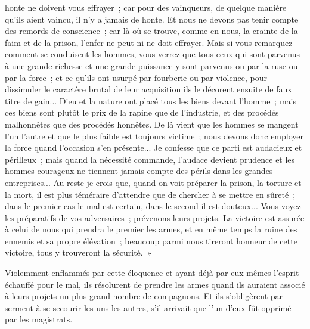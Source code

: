\documentclass[french,twoside]{book} %
\newenvironment{quoteblock}%
  {\begin{quoting}}
  {\end{quoting}}
\newenvironment{quotebar}{%
    \def\FrameCommand{{\color{rubric!10!}\vrule width 0.5em} \hspace{0.9em}}%
    \def\OuterFrameSep{\itemsep} %
    \MakeFramed {\advance\hsize-\width \FrameRestore}
  }%
  {%
    \endMakeFramed
  }
\renewenvironment{quoteblock}%
  {%
    \savenotes
    \setstretch{0.9}
    \normalfont
    \begin{quotebar}
  }
  {%
    \end{quotebar}
    \spewnotes
  }
\begin{document}
\begin{quoteblock}
honte ne doivent vous effrayer ; car pour des vain­queurs, de quelque manière qu'ils aient vaincu, il n'y a jamais de honte. Et nous ne devons pas tenir compte des remords de conscience ; car là où se trouve, comme en nous, la crainte de la faim et de la prison, l'enfer ne peut ni ne doit effrayer. Mais si vous remarquez comment se conduisent les hommes, vous verrez que tous ceux qui sont parvenus à une grande richesse et une grande puissance y sont parvenus ou par la ruse ou par la force ; et ce qu'ils ont usurpé par fourberie ou par violence, pour dissimuler le caractère brutal de leur acquisition ils le décorent ensuite de faux titre de gain... Dieu et la nature ont placé tous les biens devant l'homme ; mais ces biens sont plutôt le prix de la rapine que de l'industrie, et des procédés malhonnêtes que des procédés honnêtes. De là vient que les hommes se mangent l'un l'autre et que le plus faible est toujours victime ; nous devons donc employer la force quand l'occasion s'en présente... Je confesse que ce parti est audacieux et périlleux ; mais quand la nécessité commande, l'audace devient prudence et les hommes courageux ne tiennent jamais compte des périls dans les grandes entreprises... Au reste je crois que, quand on voit préparer la prison, la torture et la mort, il est plus téméraire d'attendre que de chercher à se mettre en sûreté ; dans le premier cas le mal est certain, dans le second il est douteux... Vous voyez les préparatifs de vos adversaires ; prévenons leurs projets. La victoire est assurée à celui de nous qui prendra le premier les armes, et en même temps la ruine des ennemis et sa propre élévation ; beaucoup parmi nous tireront honneur de cette victoire, tous y trouveront la sécurité. »\par
 Violemment enflammés par cette éloquence et ayant déjà par eux-mêmes l'esprit échauffé pour le mal, ils résolurent de prendre les armes quand ils auraient associé à leurs projets un plus grand nombre de compagnons. Et ils s'obligèrent par serment à se secourir les uns les autres, s'il arrivait que l'un d'eux fût opprimé par les magistrats.\par

\end{quoteblock}
\end{document}
